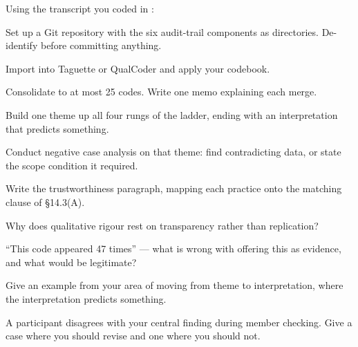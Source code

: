 \begin{lab}
Using the transcript you coded in :

\begin{tightnum}
  \item Set up a Git repository with the six audit-trail components as
    directories. De-identify before committing anything.
  \item Import into Taguette or QualCoder and apply your codebook.
  \item Consolidate to at most 25 codes. Write one memo explaining each merge.
  \item Build one theme up all four rungs of the ladder, ending with an
    interpretation that predicts something.
  \item Conduct negative case analysis on that theme: find contradicting data,
    or state the scope condition it required.
  \item Write the trustworthiness paragraph, mapping each practice onto the
    matching clause of \S14.3(A).
\end{tightnum}
\end{lab}

\begin{checkpoint}
\begin{tightnum}
  \item Why does qualitative rigour rest on transparency rather than
    replication?
  \item ``This code appeared 47 times'' --- what is wrong with offering this as
    evidence, and what would be legitimate?
  \item Give an example from your area of moving from theme to interpretation,
    where the interpretation predicts something.
  \item A participant disagrees with your central finding during member
    checking. Give a case where you should revise and one where you should not.
\end{tightnum}
\end{checkpoint}

